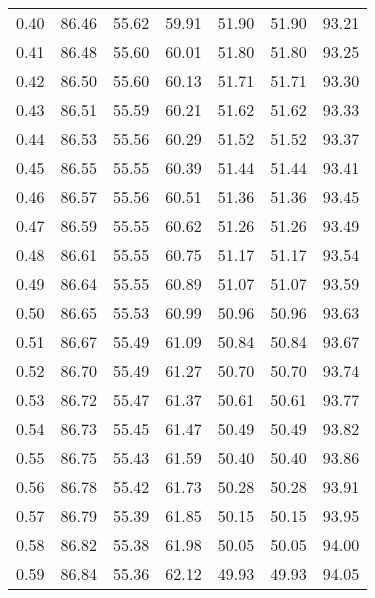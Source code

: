 \begin{tabular}{|c|c|c|c|c|c|c|}
      0.40 &     86.46 &     55.62 &      59.91 &   51.90 &      51.90 &         93.21 \\
      0.41 &     86.48 &     55.60 &      60.01 &   51.80 &      51.80 &         93.25 \\
      0.42 &     86.50 &     55.60 &      60.13 &   51.71 &      51.71 &         93.30 \\
      0.43 &     86.51 &     55.59 &      60.21 &   51.62 &      51.62 &         93.33 \\
      0.44 &     86.53 &     55.56 &      60.29 &   51.52 &      51.52 &         93.37 \\
      0.45 &     86.55 &     55.55 &      60.39 &   51.44 &      51.44 &         93.41 \\
      0.46 &     86.57 &     55.56 &      60.51 &   51.36 &      51.36 &         93.45 \\
      0.47 &     86.59 &     55.55 &      60.62 &   51.26 &      51.26 &         93.49 \\
      0.48 &     86.61 &     55.55 &      60.75 &   51.17 &      51.17 &         93.54 \\
      0.49 &     86.64 &     55.55 &      60.89 &   51.07 &      51.07 &         93.59 \\
      0.50 &     86.65 &     55.53 &      60.99 &   50.96 &      50.96 &         93.63 \\
      0.51 &     86.67 &     55.49 &      61.09 &   50.84 &      50.84 &         93.67 \\
      0.52 &     86.70 &     55.49 &      61.27 &   50.70 &      50.70 &         93.74 \\
      0.53 &     86.72 &     55.47 &      61.37 &   50.61 &      50.61 &         93.77 \\
      0.54 &     86.73 &     55.45 &      61.47 &   50.49 &      50.49 &         93.82 \\
      0.55 &     86.75 &     55.43 &      61.59 &   50.40 &      50.40 &         93.86 \\
      0.56 &     86.78 &     55.42 &      61.73 &   50.28 &      50.28 &         93.91 \\
      0.57 &     86.79 &     55.39 &      61.85 &   50.15 &      50.15 &         93.95 \\
      0.58 &     86.82 &     55.38 &      61.98 &   50.05 &      50.05 &         94.00 \\
      0.59 &     86.84 &     55.36 &      62.12 &   49.93 &      49.93 &         94.05 \\

\end{tabular}
